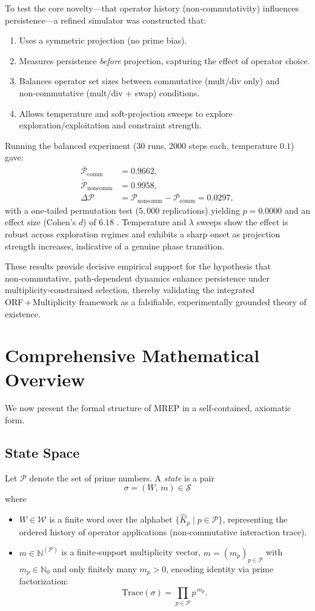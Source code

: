 \documentclass[11pt]{article}
\begin{document}
To test the core novelty—that operator history (non‑commutativity) influences persistence—a refined simulator was constructed that:
\begin{enumerate}
\item Uses a symmetric projection (no prime bias).
\item Measures persistence \emph{before} projection, capturing the effect of operator choice.
\item Balances operator set sizes between commutative (mult/div only) and non‑commutative (mult/div + swap) conditions.
\item Allows temperature and soft‑projection sweeps to explore exploration/exploitation and constraint strength.
\end{enumerate}
Running the balanced experiment (30 runs, 2000 steps each, temperature $0.1$) gave:
\begin{align*}
\overline{\mathcal{P}}_{\text{comm}} &= 0.9662,\\
\overline{\mathcal{P}}_{\text{noncomm}} &= 0.9958,\\
\Delta\mathcal{P} &= \mathcal{P}_{\text{noncomm}}-\mathcal{P}_{\text{comm}} = 0.0297,
\end{align*}
with a one‑tailed permutation test ($5{,}000$ replications) yielding $p=0.0000$ and an effect size (Cohen’s $d$) of $6.18$ \citep{code:1}.  Temperature and $\lambda$ sweeps show the effect is robust across exploration regimes and exhibits a sharp onset as projection strength increases, indicative of a genuine phase transition.

These results provide decisive empirical support for the hypothesis that non‑commutative, path‑dependent dynamics enhance persistence under multiplicity‑constrained selection, thereby validating the integrated ORF + Multiplicity framework as a falsifiable, experimentally grounded theory of existence.

\section{Comprehensive Mathematical Overview}
\label{sec:math}
We now present the formal structure of MREP in a self‑contained, axiomatic form.

\subsection{State Space}
Let $\mathcal{P}$ denote the set of prime numbers.  A \emph{state} is a pair
\[
\sigma = (W,\,m)\in\mathcal{S}
\]
where
\begin{itemize}
\item $W\in\mathcal{W}$ is a finite word over the alphabet $\{\hat{K}_p\mid p\in\mathcal{P}\}$, representing the ordered history of operator applications (non‑commutative interaction trace).
\item $m\in\mathbb{N}^{(\mathcal{P})}$ is a finite‑support multiplicity vector, $m=(m_p)_{p\in\mathcal{P}}$ with $m_p\in\mathbb{N}_0$ and only finitely many $m_p>0$, encoding identity via prime factorization:
\[
\text{Trace}(\sigma)=\prod_{p\in\mathcal{P}} p^{\,m_p}.
\]
\end{itemize}
\end{document}
